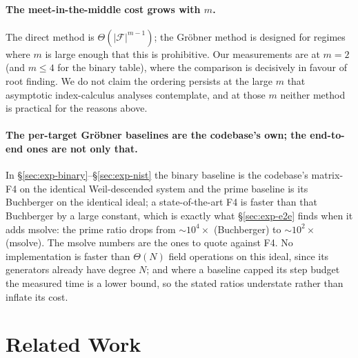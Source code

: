 \documentclass[10pt,a4paper]{article}
\theoremstyle{remark}
\newcommand{\Fb}{\mathcal{F}}
\newcommand{\abs}[1]{\lvert #1 \rvert}
\begin{document}
\paragraph{The meet-in-the-middle cost grows with $m$.} The direct
method is $\Theta(\abs{\Fb}^{m-1})$; the Gr\"obner method is designed
for regimes where $m$ is large enough that this is prohibitive. Our
measurements are at $m = 2$ (and $m \le 4$ for the binary table), where
the comparison is decisively in favour of root finding. We do not claim
the ordering persists at the large $m$ that asymptotic index-calculus
analyses contemplate, and at those $m$ neither method is practical for
the reasons above.

\paragraph{The per-target Gr\"obner baselines are the codebase's own;
the end-to-end ones are not only that.} In
\S\ref{sec:exp-binary}--\S\ref{sec:exp-nist} the binary baseline is
the codebase's matrix-F4 on the identical Weil-descended system and the
prime baseline is its Buchberger on the identical ideal; a
state-of-the-art F4 is faster than that Buchberger by a large constant,
which is exactly what \S\ref{sec:exp-e2e} finds when it adds msolve:
the prime ratio drops from $\sim\!10^4\times$ (Buchberger) to
$\sim\!10^2\times$ (msolve). The msolve numbers are the ones to quote
against F4. No implementation is faster than $\Theta(N)$ field
operations on this ideal, since its generators already have degree
$N$; and where a baseline capped its step budget the measured time is
a lower bound, so the stated ratios understate rather than inflate its
cost.

\section{Related Work}
\label{sec:related}
\end{document}
